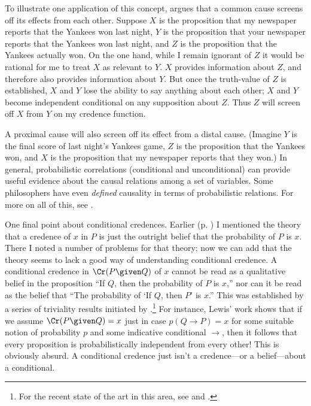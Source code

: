 To illustrate one application of this concept, \citet{ReichenbachCommon} argues that a common cause screens off its effects from each other. Suppose $X$ is the proposition that my newspaper reports that the Yankees won last night, $Y$ is the proposition that your newspaper reports that the Yankees won last night, and $Z$ is the proposition that the Yankees actually won. On the one hand, while I remain ignorant of $Z$ it would be rational for me to treat $X$ as relevant to $Y$. $X$ provides information about $Z$, and therefore also provides information about $Y$. But once the truth-value of $Z$ is established, $X$ and $Y$ lose the ability to say anything about each other; $X$ and $Y$ become independent conditional on any supposition about $Z$. Thus $Z$ will screen off $X$ from $Y$ on my credence function.

A proximal cause will also screen off its effect from a distal cause. (Imagine $Y$ is the final score of last night's Yankees game, $Z$ is the proposition that the Yankees won, and $X$ is the proposition that my newspaper reports that they won.) In general, probabilistic correlations (conditional and unconditional) can provide useful evidence about the causal relations among a set of variables. Some philosophers have even \emph{defined} causality in terms of probabilistic relations. For more on all of this, see \citet{HitchcockSEP}.

One final point about conditional credences. Earlier (p. \pageref{titelbaum-outright}) I mentioned the theory that a credence of $x$ in $P$ is just the outright belief that the probability of $P$ is $x$. There I noted a number of problems for that theory; now we can add that the theory seems to lack a good way of understanding conditional credence. A conditional credence in $\Cr(P \given Q)$ of $x$ cannot be read as a qualitative belief in the proposition ``If $Q$, then the probability of $P$ is $x$,'' nor can it be read as the belief that ``The probability of `If $Q$, then $P$' is $x$.'' This was established by a series of triviality results initiated by \citet{LewisProbCond}.\footnote
{For the recent state of the art in this area, see \citet{HajekTriviality} and \citet{FitelsonTriviality}.}
 For instance, Lewis' work shows that if we assume $\Cr(P \given Q)=x$ just in case $p(Q \rightarrow P)=x$ for some suitable notion of probability $p$ and some indicative conditional $\rightarrow$, then it follows that every proposition is probabilistically independent from every other! This is obviously absurd. A conditional credence just isn't a credence---or a belief---about a conditional. 

